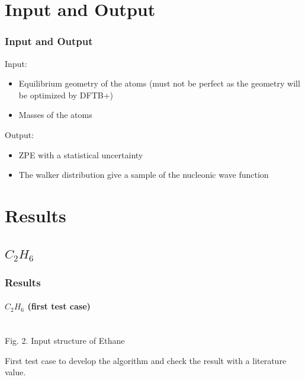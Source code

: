 \documentclass[16pt]{beamer}
\begin{document}
\section{Input and Output}
\begin{frame}
\frametitle{Input and Output}
Input:\\
\begin{itemize}
\item Equilibrium geometry of the atoms (must not be perfect as the geometry will be optimized by DFTB+)
\item Masses of the atoms
\end{itemize}
Output:
\begin{itemize}
\item ZPE with a statistical uncertainty
\item The walker distribution give a sample of the nucleonic wave function
\end{itemize}
\end{frame}

\section{Results}

\subsection{$C_2 H_6$}
\begin{frame}
\frametitle{Results}
\framesubtitle{$C_2 H_6$ (first test case)}
\begin{center}
\\
Fig. 2. Input structure of Ethane
\end{center}
First test case to develop the algorithm and check the result with a literature value.
\end{frame}
\end{document}
